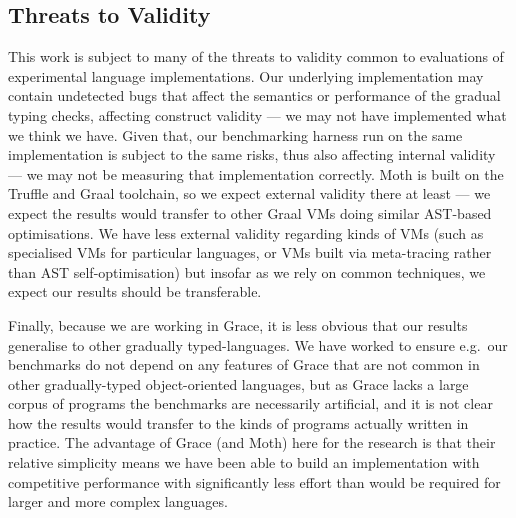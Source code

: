 \subsection{Threats to Validity}


This work is subject to many of the threats to validity common to
evaluations of experimental language implementations.  Our underlying
implementation may contain undetected bugs that affect the semantics
or performance of the gradual typing checks, affecting construct
validity --- we may not have implemented what we think we have. Given
that, our benchmarking harness run on the same implementation is
subject to the same risks, thus also affecting internal validity ---
we may not be measuring that implementation correctly.  Moth is built
on the Truffle and Graal toolchain, so we expect external validity
there at least --- we expect the results would transfer to other Graal
VMs doing similar AST-based optimisations.  We have less external
validity regarding kinds of VMs (such as specialised VMs for
particular languages, or VMs built via meta-tracing rather than AST
self-optimisation) but insofar as we rely on common techniques, we
expect our results should be transferable.

Finally, because we are working in Grace, it is less obvious that our
results generalise to other gradually typed-languages. We have worked
to ensure e.g.\ our benchmarks do not depend on any features of Grace
that are not common in other gradually-typed object-oriented
languages, but as Grace lacks a large corpus of programs the
benchmarks are necessarily artificial, and it is not clear how the
results would transfer to the kinds of programs actually written in
practice. The advantage of Grace (and Moth) here for the research is
that their relative simplicity means we have been able to build an
implementation with competitive performance with significantly less
effort than would be required for larger and more complex languages.
